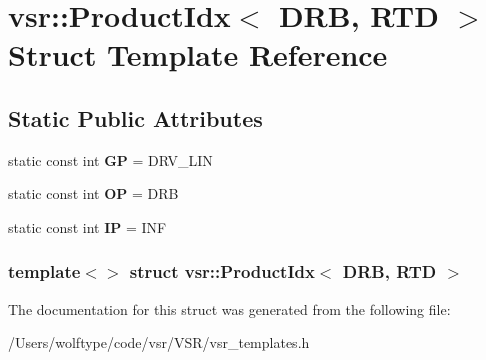 \hypertarget{structvsr_1_1_product_idx_3_01_d_r_b_00_01_r_t_d_01_4}{\section{vsr\-:\-:Product\-Idx$<$ D\-R\-B, R\-T\-D $>$ Struct Template Reference}
\label{structvsr_1_1_product_idx_3_01_d_r_b_00_01_r_t_d_01_4}
}
\subsection*{Static Public Attributes}
\begin{DoxyCompactItemize}
\item 
\hypertarget{structvsr_1_1_product_idx_3_01_d_r_b_00_01_r_t_d_01_4_a74df0369e372a833bc0573fa7efe8d08}{static const int {\bfseries G\-P} = D\-R\-V\-\_\-\-L\-I\-N}\label{structvsr_1_1_product_idx_3_01_d_r_b_00_01_r_t_d_01_4_a74df0369e372a833bc0573fa7efe8d08}

\item 
\hypertarget{structvsr_1_1_product_idx_3_01_d_r_b_00_01_r_t_d_01_4_a6cead78ac1f8c0fdbcad9f6ca7ada3d2}{static const int {\bfseries O\-P} = D\-R\-B}\label{structvsr_1_1_product_idx_3_01_d_r_b_00_01_r_t_d_01_4_a6cead78ac1f8c0fdbcad9f6ca7ada3d2}

\item 
\hypertarget{structvsr_1_1_product_idx_3_01_d_r_b_00_01_r_t_d_01_4_a7b83133e22f5a0a193d779e61bd21ab9}{static const int {\bfseries I\-P} = I\-N\-F}\label{structvsr_1_1_product_idx_3_01_d_r_b_00_01_r_t_d_01_4_a7b83133e22f5a0a193d779e61bd21ab9}

\end{DoxyCompactItemize}
\subsubsection*{template$<$$>$ struct vsr\-::\-Product\-Idx$<$ D\-R\-B, R\-T\-D $>$}



The documentation for this struct was generated from the following file\-:\begin{DoxyCompactItemize}
\item 
/\-Users/wolftype/code/vsr/\-V\-S\-R/vsr\-\_\-templates.\-h\end{DoxyCompactItemize}
